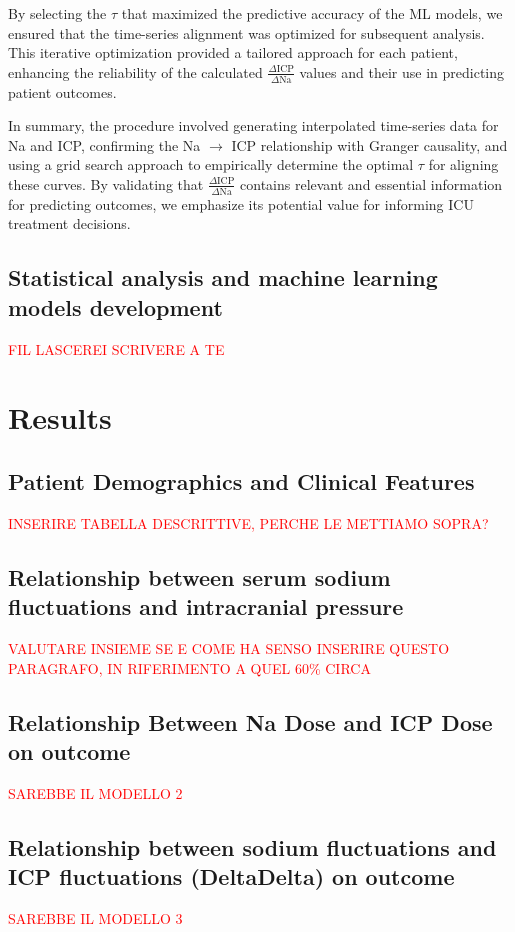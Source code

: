 By selecting the $\tau$ that maximized the predictive accuracy of the ML models, we ensured that the time-series alignment was optimized for subsequent analysis. This iterative optimization provided a tailored approach for each patient, enhancing the reliability of the calculated \(\frac{\Delta \text{ICP}}{\Delta \text{Na}}\) values and their use in predicting patient outcomes.

In summary, the procedure involved generating interpolated time-series data for Na and ICP, confirming the Na $\rightarrow$ ICP relationship with Granger causality, and using a grid search approach to empirically determine the optimal $\tau$ for aligning these curves. By validating that \(\frac{\Delta \text{ICP}}{\Delta \text{Na}}\) contains relevant and essential information for predicting outcomes, we emphasize its potential value for informing ICU treatment decisions.




\subsection{Statistical analysis and machine learning models development}
\textcolor{red}{FIL LASCEREI SCRIVERE A TE}

\section {Results}
\subsection{Patient Demographics and Clinical Features}
\textcolor{red}{INSERIRE TABELLA DESCRITTIVE, PERCHE LE METTIAMO SOPRA?}

\subsection{Relationship between serum sodium fluctuations and intracranial pressure}
\textcolor{red}{VALUTARE INSIEME SE E COME HA SENSO INSERIRE QUESTO PARAGRAFO, IN RIFERIMENTO A QUEL 60\% CIRCA}

\subsection{Relationship Between Na Dose and ICP Dose on outcome}
\textcolor{red}{SAREBBE IL MODELLO 2}

\subsection{Relationship between sodium fluctuations and ICP fluctuations (DeltaDelta) on outcome}
\textcolor{red}{SAREBBE IL MODELLO 3}


